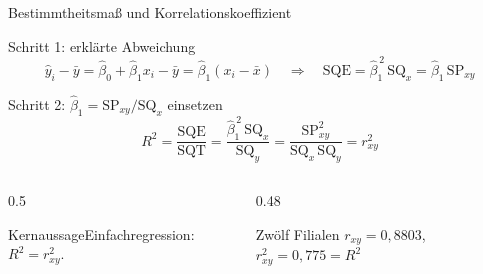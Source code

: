 \documentclass[aspectratio=169,11pt]{beamer}
\newcommand{\kernaussage}[1]{\begin{alertblock}{Kernaussage}#1\end{alertblock}}
\newcommand{\SQx}{\text{SQ}_x}
\newcommand{\SQy}{\text{SQ}_y}
\newcommand{\SPxy}{\text{SP}_{xy}}
\begin{document}
\begin{frame}{Bestimmtheitsmaß und Korrelationskoeffizient}
  \begin{block}{Schritt 1: erklärte Abweichung}
    \vspace{-4pt}
    \[
      \hat{y}_i - \bar{y} = \hat{\beta}_0 + \hat{\beta}_1 x_i - \bar{y} = \hat{\beta}_1 (x_i - \bar{x})
      \quad\Longrightarrow\quad
      \text{SQE} = \hat{\beta}_1^{\,2}\,\SQx = \hat{\beta}_1\,\SPxy
    \]
    \vspace{-10pt}
  \end{block}

  \begin{block}{Schritt 2: $\hat{\beta}_1 = \SPxy / \SQx$ einsetzen}
    \vspace{-4pt}
    \[
      R^{2} = \frac{\text{SQE}}{\text{SQT}}
      = \frac{\hat{\beta}_1^{\,2}\,\SQx}{\SQy}
      = \frac{\SPxy^{2}}{\SQx\,\SQy}
      = r_{xy}^{2}
    \]
    \vspace{-10pt}
  \end{block}

  \medskip

  \begin{columns}[T]
    \begin{column}{0.5\textwidth}
      \kernaussage{Einfachregression: $R^{2} = r_{xy}^{2}$.}
    \end{column}
    \begin{column}{0.48\textwidth}
      \begin{exampleblock}{Zwölf Filialen}
        $r_{xy} = 0{,}8803$, \quad $r_{xy}^{2} = 0{,}775 = R^{2}$ \checkmark
      \end{exampleblock}
    \end{column}
  \end{columns}
\end{frame}
\end{document}
